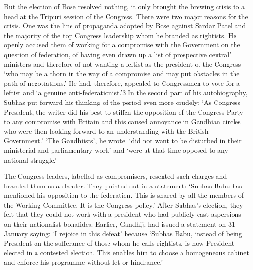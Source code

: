 \begin{multicols}{2}
But the election of Bose resolved nothing, it only brought the brewing crisis to a head at the Tripuri session of the Congress. There were two major reasons for the crisis. One was the line of propaganda adopted by Bose against Sardar Patel and the majority of the top Congress leadership whom he branded as rightists. He openly accused them of working for a compromise with the Government on the question of federation, of having even drawn up a list of prospective central' ministers and therefore of not wanting a leftist as the president of the Congress `who may be a thorn in the way of a compromise and may put obstacles in the path of negotiations.' He had, therefore, appealed to Congressmen to vote for a leftist and `a genuine anti-federationist.'3 In the second part of his autobiography, Subhas put forward his thinking of the period even more crudely: `As Congress President, the writer did his best to stiffen the opposition of the Congress Party to any compromise with Britain and this caused annoyance in Gandhian circles who were then looking forward to an understanding with the British Government.' `The Gandhiists', he wrote, `did not want to be disturbed in their ministerial and parliamentary work' and `were at that time opposed to any national struggle.' 

The Congress leaders, labelled as compromisers, resented such charges and branded them as a slander. They pointed out in a statement: `Subhas Babu has mentioned his opposition to the federation. This is shared by all the members of the Working Committee. It is the Congress policy.' After Subhas's election, they felt that they could not work with a president who had publicly cast aspersions on their nationalist bonafides. Earlier, Gandhiji had issued a statement on 31 January saying: `I rejoice in this defeat' because `Subhas Babu, instead of being President on the sufferance of those whom he calls rightists, is now President elected in a contested election. This enables him to choose a homogeneous cabinet and enforce his programme without let or hindrance.' 


\end{multicols}
